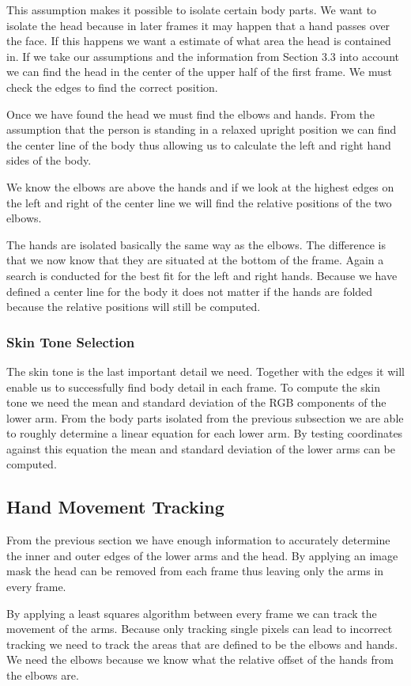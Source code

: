 \documentclass[a4paper,11pt,titlepage]{article}
\begin{document}
This assumption makes it possible to isolate certain body parts. We want to isolate the head because in later frames it may happen that a hand passes over the face. If this happens we want a estimate of what area the head is contained in. If we take our assumptions and the information from Section 3.3 into account we can find the head in the center of the upper half of the first frame. We must check the edges to find the correct position.

Once we have found the head we must find the elbows and hands. From the assumption that the person is standing in a relaxed upright position we can find the center line of the body thus allowing us to calculate the left and right hand sides of the body.

We know the elbows are above the hands and if we look at the highest edges on the left and right of the center line we will find the relative positions of the two elbows.

The hands are isolated basically the same way as the elbows. The difference is that we now know that they are situated at the bottom of the frame. Again a search is conducted for the best fit for the left and right hands. Because we have defined a center line for the body it does not matter if the hands are folded because the relative positions will still be computed.
\subsubsection{Skin Tone Selection}
The skin tone is the last important detail we need. Together with the edges it will enable us to successfully find body detail in each frame. To compute the skin tone we need the mean and standard deviation of the RGB components of the lower arm. From the body parts isolated from the previous subsection we are able to roughly determine a linear equation for each lower arm. By testing coordinates against this equation the mean and standard deviation of the lower arms can be computed.

\subsection{Hand Movement Tracking}
From the previous section we have enough information to accurately determine the inner and outer edges of the lower arms and the head. By applying an image mask the head can be removed from each frame thus leaving only the arms in every frame.

By applying a least squares algorithm between every frame we can track the movement of the arms. Because only tracking single pixels can lead to incorrect tracking we need to track the areas that are defined to be the elbows and hands. We need the elbows because we know what the relative offset of the hands from the elbows are.
\end{document}
